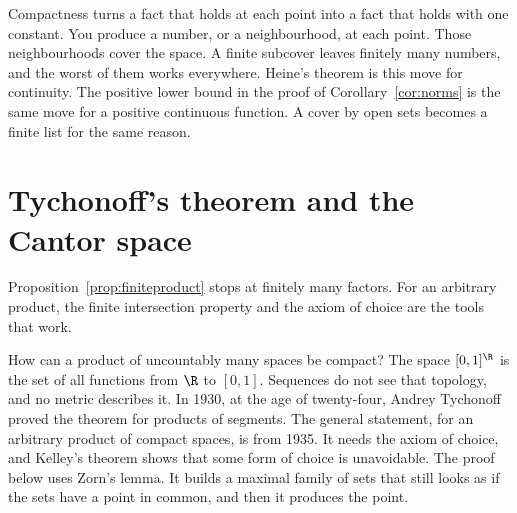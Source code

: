 \begin{beauty}
Compactness turns a fact that holds at each point into a fact that holds with one constant. You produce a number, or a neighbourhood, at each point. Those neighbourhoods cover the space. A finite subcover leaves finitely many numbers, and the worst of them works everywhere. Heine's theorem is this move for continuity. The positive lower bound in the proof of Corollary~\ref{cor:norms} is the same move for a positive continuous function. A cover by open sets becomes a finite list for the same reason.
\end{beauty}

\section{Tychonoff's theorem and the Cantor space}

Proposition~\ref{prop:finiteproduct} stops at finitely many factors. For an arbitrary product, the finite intersection property and the axiom of choice are the tools that work.

How can a product of uncountably many spaces be compact? The space $[0,1]^{\R}$ is the set of all functions from $\R$ to $[0,1]$. Sequences do not see that topology, and no metric describes it. In 1930, at the age of twenty-four, Andrey Tychonoff proved the theorem for products of segments. The general statement, for an arbitrary product of compact spaces, is from 1935. It needs the axiom of choice, and Kelley's theorem shows that some form of choice is unavoidable. The proof below uses Zorn's lemma. It builds a maximal family of sets that still looks as if the sets have a point in common, and then it produces the point.

